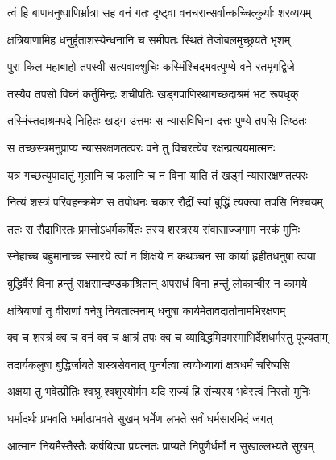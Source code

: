 \twolineshloka
{त्वं हि बाणधनुष्पाणिर्भ्रात्रा सह वनं गतः}
{दृष्ट्वा वनचरान्सर्वान्कच्चित्कुर्याः शरव्ययम्} %

\twolineshloka
{क्षत्रियाणामिह धनुर्हुताशस्येन्धनानि च}
{समीपतः स्थितं तेजोबलमुच्छ्रयते भृशम्} %

\twolineshloka
{पुरा किल महाबाहो तपस्वी सत्यवाक्शुचिः}
{कस्मिंश्चिदभवत्पुण्ये वने रतमृगद्विजे} %

\twolineshloka
{तस्यैव तपसो विघ्नं कर्तुमिन्द्रः शचीपतिः}
{खड्गपाणिरथागच्छदाश्रमं भट रूपधृक्} %

\twolineshloka
{तस्मिंस्तदाश्रमपदे निहितः खड्ग उत्तमः}
{स न्यासविधिना दत्तः पुण्ये तपसि तिष्ठतः} %

\twolineshloka
{स तच्छस्त्रमनुप्राप्य न्यासरक्षणतत्परः}
{वने तु विचरत्येव रक्षन्प्रत्ययमात्मनः} %

\twolineshloka
{यत्र गच्छत्युपादातुं मूलानि च फलानि च}
{न विना याति तं खड्गं न्यासरक्षणतत्परः} %

\twolineshloka
{नित्यं शस्त्रं परिवहन्क्रमेण स तपोधनः}
{चकार रौद्रीं स्वां बुद्धिं त्यक्त्वा तपसि निश्चयम्} %

\twolineshloka
{ततः स रौद्राभिरतः प्रमत्तोऽधर्मकर्षितः}
{तस्य शस्त्रस्य संवासाज्जगाम नरकं मुनिः} %

\twolineshloka
{स्नेहाच्च बहुमानाच्च स्मारये त्वां न शिक्षये}
{न कथञ्चन सा कार्या हृहीतधनुषा त्वया} %

\twolineshloka
{बुद्धिर्वैरं विना हन्तुं राक्षसान्दण्डकाश्रितान्}
{अपराधं विना हन्तुं लोकान्वीर न कामये} %

\twolineshloka
{क्षत्रियाणां तु वीराणां वनेषु नियतात्मनाम्}
{धनुषा कार्यमेतावदार्तानामभिरक्षणम्} %

\twolineshloka
{क्व च शस्त्रं क्व च वनं क्व च क्षात्रं तपः क्व च}
{व्याविद्धमिदमस्माभिर्देशधर्मस्तु पूज्यताम्} %

\twolineshloka
{तदार्यकलुषा बुद्धिर्जायते शस्त्रसेवनात्}
{पुनर्गत्वा त्वयोध्यायां क्षत्रधर्मं चरिष्यसि} %

\twolineshloka
{अक्षया तु भवेत्प्रीतिः श्वश्रू श्वशुरयोर्मम}
{यदि राज्यं हि संन्यस्य भवेस्त्वं निरतो मुनिः} %

\twolineshloka
{धर्मादर्थः प्रभवति धर्मात्प्रभवते सुखम्}
{धर्मेण लभते सर्वं धर्मसारमिदं जगत्} %

\twolineshloka
{आत्मानं नियमैस्तैस्तैः कर्षयित्वा प्रयत्नतः}
{प्राप्यते निपुणैर्धर्मो न सुखाल्लभ्यते सुखम्} %

